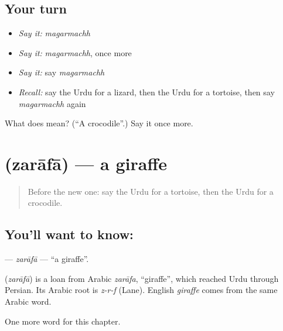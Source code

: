 \subsection*{Your turn}
\begin{itemize}
\raggedright
  \item \emph{Say it:} \emph{magarmachh}
  \item \emph{Say it:} \emph{magarmachh}, once more
  \item \emph{Say it:} say \emph{magarmachh}
  \item \emph{Recall:} say the Urdu for a lizard, then the Urdu for a tortoise, then say \emph{magarmachh} again
\end{itemize}

\begin{tcolorbox}[breakable,colback=teal!4,colframe=teal!35!black,title={Before you move on}]
What does  mean? (\textquotedblleft{}A crocodile\textquotedblright{}.) Say it once more.
\end{tcolorbox}
\section[\texorpdfstring{\ur{زرافہ} (zarāfā)}{زرافہ (zarāfā)}]{ (zarāfā) — a giraffe}

\label{lesson:UR-C253-zarafa}



\begin{quote}
Before the new one: say the Urdu for a tortoise, then the Urdu for a crocodile.
\end{quote}

\subsection*{You'll want to know: }
\textbf{} — \emph{zarāfā} — \textquotedblleft{}a giraffe\textquotedblright{}.

\begin{cousinweb}
\textbf{} (\emph{zarāfā}) is a loan from Arabic \emph{zarāfa}, \textquotedblleft{}giraffe\textquotedblright{}, which reached Urdu through Persian. Its Arabic root is \emph{z-r-f} (Lane). English \emph{giraffe} comes from the same Arabic word.
\end{cousinweb}

\begin{grammarlens}[title={What you've built}]
One more word for this chapter.
\end{grammarlens}

